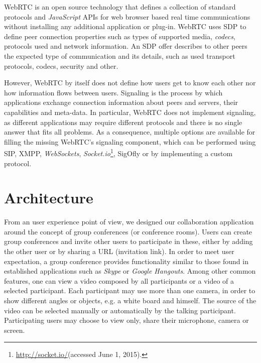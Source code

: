 \documentclass[10pt,conference]{IEEEtran}
\begin{document}
\gls{WebRTC} is an open source technology that defines a collection of standard protocols and \emph{JavaScript} \gls{API}s for web browser based real time communications without installing any additional application or plug-in. 
\gls{WebRTC} uses \gls{SDP} \cite{rfc4566} to define peer connection properties such as types of supported media, \emph{codecs}, protocols used and network information. An \gls{SDP} offer describes to other peers the expected type of communication and its details, such as used transport protocols, codecs, security and other.



However, \gls{WebRTC} by itself does not define how users get to know each other nor how information flows between users. 
  Signaling is the process by which applications exchange connection information about peers and servers, their capabilities and meta-data.
  In particular, \gls{WebRTC} does not implement signaling, as different applications may require different protocols and there is no single answer that fits all problems.
  As a consequence, multiple options are available for filling the missing \gls{WebRTC}'s signaling component, which can be performed using \gls{SIP}\cite{rfc3261}, \gls{XMPP}, \emph{WebSockets}, \emph{Socket.io}\footnote{\url{http://socket.io/}(accessed June 1, 2015).}, \gls{SigOfly}\cite{sigofly} or by implementing a custom protocol.

 	











\section{Architecture}
\label{chapter:architecture}

From an user experience point of view, we designed our collaboration application around the concept of group conferences (or conference rooms).
Users can create group conferences and invite other users to participate in these, either by adding the other user or by sharing a \gls{URL} (invitation link).
In order to meet user expectation, a group conference provides functionality similar to those found in established applications such as \emph{Skype} or \emph{Google Hangouts}.
Among other common features, one can view a video composed by all participants or a video of a selected participant.
Each participant may use more than one camera, in order to show different angles or objects, e.g. a white board and himself.
The source of the video can be selected manually or automatically by the talking participant.
Participating users may choose to view only, share their microphone, camera or screen.
\end{document}
